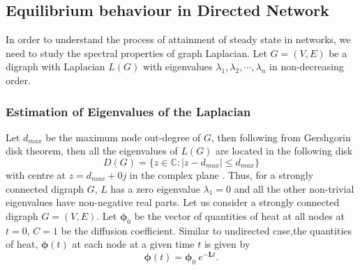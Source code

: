 \documentclass[10pt,a4paper]{article}
\begin{document}
        \subsection{Equilibrium behaviour in Directed Network}
        In order to understand the process of attainment of steady state in networks, we need to study the spectral properties of graph Laplacian. Let $G=(V,E)$ be a digraph with Laplacian $L(G)$ with eigenvalues $\lambda_1, \lambda_2, \cdots, \lambda_n$ in non-decreasing order. 
        \subsubsection{Estimation of Eigenvalues of the Laplacian}
        Let $d_{max}$ be the maximum node out-degree of $G$, then following from Gershgorin disk theorem, then all the eigenvalues of $L(G)$ are located in the following disk
        \begin{equation} 
        D(G) = \{ z \in \mathbb{C} : |z-d_{max}| \leq d_{max} \}
        \end{equation}
        with centre at $z = d_{max} +0j$ in the complex plane \citep{saber2003agreement}. Thus, for a strongly connected digraph $G$, $L$ has a zero eigenvalue $\lambda_1=0$ and all the other non-trivial eigenvalues have non-negative real parts.
        Let us consider a strongly connected digraph $G=(V,E)$. Let $\boldsymbol{\phi}_0$ be the vector of quantities of heat at all nodes at $t=0$, $C=1$ be the diffusion coefficient. Similar to undirected case,the quantities of heat, $\boldsymbol{\phi}(t)$ at each node at a given time $t$ is given by
        \begin{equation}
        \boldsymbol{\phi}(t) = \boldsymbol{\phi}_0~e^{-\mathbf{L}t}.
        \end{equation}
        
\end{document}
